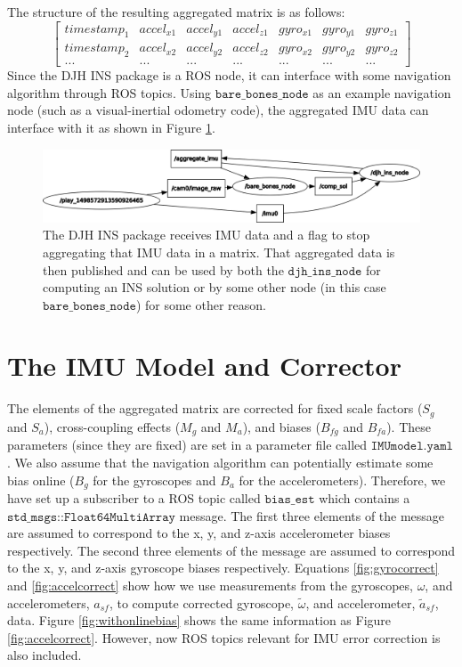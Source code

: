 \documentclass[11pt,a4paper]{article}
\begin{document}
The structure of the resulting aggregated matrix is as follows:
\begin{equation*}
	\left[\begin{array}{ccccccc}
		timestamp_1 & accel_{x1} & accel_{y1} & accel_{z1} & gyro_{x1} &  gyro_{y1} & gyro_{z1} \\
		timestamp_2 & accel_{x2} & accel_{y2} & accel_{z2} & gyro_{x2} &  gyro_{y2} & gyro_{z2} \\
		... & ... & ... & ... & ... & ... & ...
	\end{array}\right]
\end{equation*}
Since the DJH INS package is a ROS node, it can interface with some navigation algorithm through ROS topics. Using $\texttt{bare\_bones\_node}$ as an example navigation node (such as a visual-inertial odometry code), the aggregated IMU data can interface with it as shown in Figure \ref{fig:djhinsagg}.


\begin{figure}
	\centering
	\includegraphics[scale=0.425]{djhinsagg}
	\caption{The DJH INS package receives IMU data and a flag to stop aggregating that IMU data in a matrix. That aggregated data is then published and can be used by both the $\texttt{djh\_ins\_node}$ for computing an INS solution or by some other node (in this case $\texttt{bare\_bones\_node}$) for some other reason.}
	\label{fig:djhinsagg}
\end{figure}

\section{The IMU Model and Corrector}

The elements of the aggregated matrix are corrected for fixed scale factors ($S_g$ and $S_a$), cross-coupling effects ($M_g$ and $M_a$), and biases ($B_{fg}$ and $B_{fa}$). These parameters (since they are fixed) are set in a parameter file called $\texttt{IMUmodel.yaml}$. We also assume that the navigation algorithm can potentially estimate some bias online ($B_g$ for the gyroscopes and $B_a$ for the accelerometers). Therefore, we have set up a subscriber to a ROS topic called $\texttt{bias\_est}$ which contains a $\texttt{std\_msgs::Float64MultiArray}$ message. The first three elements of the message are assumed to correspond to the x, y, and z-axis accelerometer biases respectively. The second three elements of the message are assumed to correspond to the x, y, and z-axis gyroscope biases respectively. Equations \ref{fig:gyrocorrect} and \ref{fig:accelcorrect} show how we use measurements from the gyroscopes, $\omega$, and accelerometers, $a_{sf}$, to compute corrected gyroscope, $\tilde{\omega}$, and accelerometer, $\tilde{a}_{sf}$, data. Figure \ref{fig:withonlinebias} shows the same information as Figure \ref{fig:accelcorrect}. However, now ROS topics relevant for IMU error correction is also included.
\end{document}
